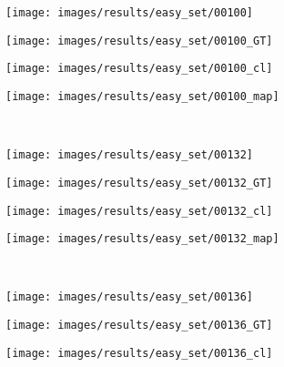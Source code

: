 \begin{figure}[t]
\centering
 \begin{subfigure}[c]{0.24\textwidth}
  \centering
  \texttt{[image: images/results/easy\_set/00100]}
 \end{subfigure}
 \begin{subfigure}[c]{0.24\textwidth}
  \centering
  \texttt{[image: images/results/easy\_set/00100\_GT]}
 \end{subfigure}
 \begin{subfigure}[c]{0.24\textwidth}
  \centering
  \texttt{[image: images/results/easy\_set/00100\_cl]}
 \end{subfigure}
 \begin{subfigure}[c]{0.24\textwidth}
  \centering
  \texttt{[image: images/results/easy\_set/00100\_map]}
 \end{subfigure}
 \\
 \begin{subfigure}[c]{0.24\textwidth}
  \centering
  \texttt{[image: images/results/easy\_set/00132]}
 \end{subfigure}
 \begin{subfigure}[c]{0.24\textwidth}
  \centering
  \texttt{[image: images/results/easy\_set/00132\_GT]}
 \end{subfigure}
 \begin{subfigure}[c]{0.24\textwidth}
  \centering
  \texttt{[image: images/results/easy\_set/00132\_cl]}
 \end{subfigure}
 \begin{subfigure}[c]{0.24\textwidth}
  \centering
  \texttt{[image: images/results/easy\_set/00132\_map]}
 \end{subfigure}
 \\
 \begin{subfigure}[c]{0.24\textwidth}
  \centering
  \texttt{[image: images/results/easy\_set/00136]}
 \end{subfigure}
 \begin{subfigure}[c]{0.24\textwidth}
  \centering
  \texttt{[image: images/results/easy\_set/00136\_GT]}
 \end{subfigure}
 \begin{subfigure}[c]{0.24\textwidth}
  \centering
  \texttt{[image: images/results/easy\_set/00136\_cl]}
 \end{subfigure}
 \begin{subfigure}[c]{0.24\textwidth}

\end{subfigure}
\end{figure}
